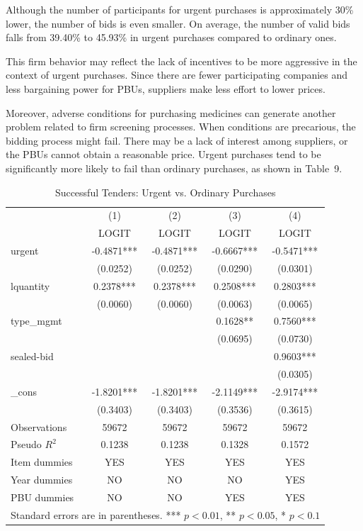 Although the number of participants for urgent purchases is approximately 30\% lower, the number of bids is even smaller. On average, the number of valid bids falls from 39.40\% to 45.93\% in urgent purchases compared to ordinary ones.

This firm behavior may reflect the lack of incentives to be more aggressive in the context of urgent purchases. Since there are fewer participating companies and less bargaining power for PBUs, suppliers make less effort to lower prices.

Moreover, adverse conditions for purchasing medicines can generate another problem related to firm screening processes. When conditions are precarious, the bidding process might fail. There may be a lack of interest among suppliers, or the PBUs cannot obtain a reasonable price. Urgent purchases tend to be significantly more likely to fail than ordinary purchases, as shown in Table~9.

\begin{table}[ht]
  \centering
  \caption{Successful Tenders: Urgent vs. Ordinary Purchases}
  \begin{tabular}{lcccc}
    \hline
           & (1)        & (2)        & (3)        & (4)        \\
           & LOGIT     & LOGIT      & LOGIT      & LOGIT      \\
    \hline
    urgent     & -0.4871*** & -0.4871*** & -0.6667*** & -0.5471*** \\
               & (0.0252)   & (0.0252)   & (0.0290)   & (0.0301)   \\
    lquantity  & 0.2378***  & 0.2378***  & 0.2508***  & 0.2803***  \\
               & (0.0060)   & (0.0060)   & (0.0063)   & (0.0065)   \\
    type\_mgmt &            &            & 0.1628**   & 0.7560***  \\
               &            &            & (0.0695)   & (0.0730)   \\
    sealed-bid &            &            &           & 0.9603***  \\
               &            &            &           & (0.0305)   \\
    \_cons     & -1.8201*** & -1.8201*** & -2.1149*** & -2.9174*** \\
               & (0.3403)   & (0.3403)   & (0.3536)   & (0.3615)   \\
    Observations & 59672   & 59672     & 59672     & 59672     \\
    Pseudo $R^2$ & 0.1238  & 0.1238    & 0.1328    & 0.1572    \\
    Item dummies & YES     & YES       & YES       & YES       \\
    Year dummies & NO      & NO        & NO        & YES       \\
    PBU dummies & NO       & NO        & YES       & YES       \\
    \hline
    \multicolumn{5}{l}{\footnotesize Standard errors are in parentheses. *** $p<0.01$, ** $p<0.05$, * $p<0.1$}
  \end{tabular}
\end{table}

